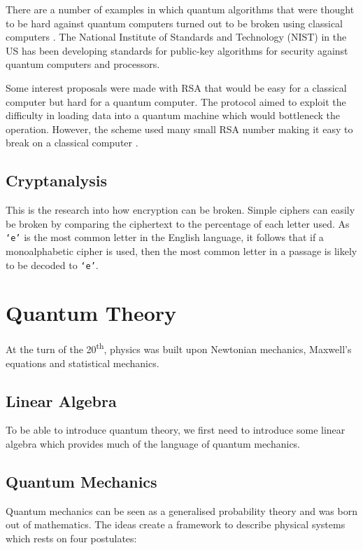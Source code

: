 There are a number of examples in which quantum algorithms that were thought to be hard against quantum computers turned out to be broken using classical computers . The National Institute of Standards and Technology (NIST) in the US has been developing standards for public-key algorithms for security against quantum computers and processors.

Some interest proposals were made with RSA that would be easy for a classical computer but hard for a quantum computer. The protocol aimed to exploit the difficulty in loading data into a quantum machine which would bottleneck the operation. However, the scheme used many small RSA number making it easy to break on a classical computer .

\subsection{Cryptanalysis}
\label{sec1:cryptanalysis}

This is the research into how encryption can be broken. Simple ciphers can easily be broken by comparing the ciphertext to the percentage of each letter used. As \texttt{`e'} is the most common letter in the English language, it follows that if a monoalphabetic cipher is used, then the most common letter in a passage is likely to be decoded to \texttt{`e'}.

\section{Quantum Theory}

At the turn of the 20\textsuperscript{th}, physics was built upon Newtonian mechanics, Maxwell's equations and statistical mechanics. 

\subsection{Linear Algebra}

To be able to introduce quantum theory, we first need to introduce some linear algebra which provides much of the language of quantum mechanics.

\subsection{Quantum Mechanics}

Quantum mechanics can be seen as a generalised probability theory and was born out of mathematics. The ideas create a framework to describe physical systems which rests on four postulates:


